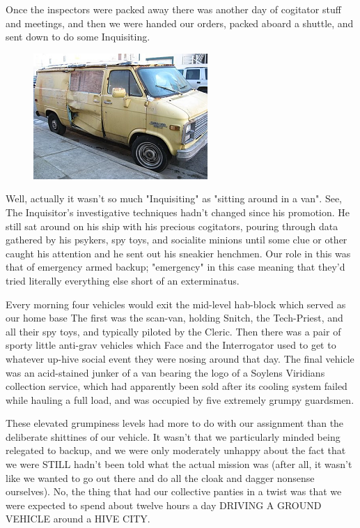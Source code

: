 Once the inspectors were packed away there was another day of cogitator stuff and meetings, and then we were handed our orders, packed aboard a shuttle, and sent down to do some Inquisiting.

\begin{figure}
	\begin{center}
		\includegraphics[width=\figwidth]{pics/17/29.png}
	\end{center}
\end{figure}
Well, actually it wasn't so much "Inquisiting" as "sitting around in a van". 
See, The Inquisitor's investigative techniques hadn't changed since his promotion. 
He still sat around on his ship with his precious cogitators, pouring through data gathered by his psykers, spy toys, and socialite minions until some clue or other caught his attention and he sent out his sneakier henchmen. 
Our role in this was that of emergency armed backup; 
"emergency" in this case meaning that they'd tried literally everything else short of an exterminatus. 


Every morning four vehicles would exit the mid-level hab-block which served as our home base The first was the scan-van, holding Snitch, the Tech-Priest, and all their spy toys, and typically piloted by the Cleric. 
Then there was a pair of sporty little anti-grav vehicles which Face and the Interrogator used to get to whatever up-hive social event they were nosing around that day. 
The final vehicle was an acid-stained junker of a van bearing the logo of a Soylens Viridians collection service, which had apparently been sold after its cooling system failed while hauling a full load, and was occupied by five extremely grumpy guardsmen.

These elevated grumpiness levels had more to do with our assignment than the deliberate shittines of our vehicle. 
It wasn't that we particularly minded being relegated to backup, and we were only moderately unhappy about the fact that we were STILL hadn't been told what the actual mission was (after all, it wasn't like we wanted to go out there and do all the cloak and dagger nonsense ourselves). 
No, the thing that had our collective panties in a twist was that we were expected to spend about twelve hours a day DRIVING A GROUND VEHICLE around a HIVE CITY.

